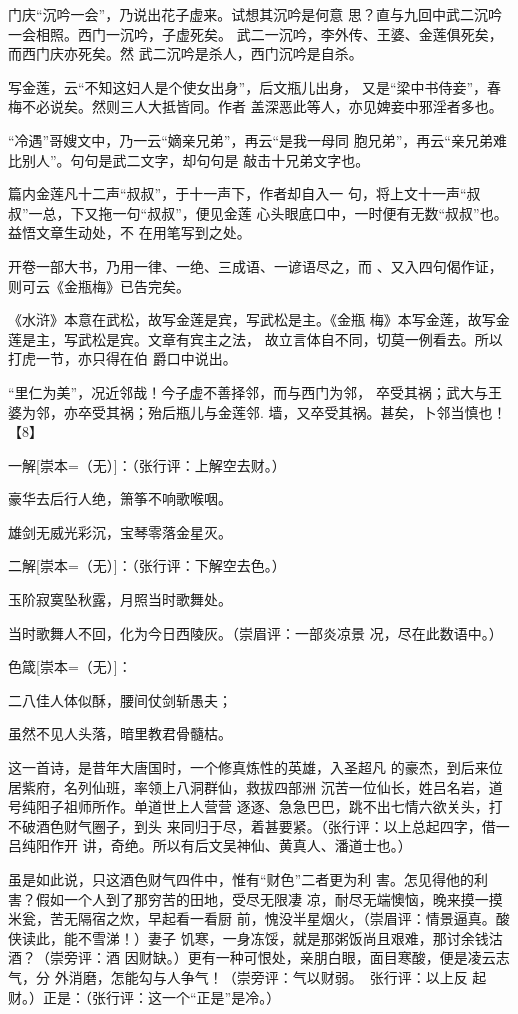 \documentclass[UTF8,scheme=chinese,11pt,linespread=1.4]{ctexbook}
\makeatletter
\newcommand{\banben}[2][]{#2}
\newenvironment{diben}[1]
  {\list{}{\listparindent 2em
    \itemindent\listparindent
    \rightmargin 0em  %
    \leftmargin 0em  %
    \parsep \z@ \@plus\p@}%
   \item\relax}
  {\endlist}
\makeatother
\begin{document}
\begin{diben}
西门庆“沉吟一会”，乃说出花子虚来。试想其沉吟是何意
思？直与九回中武二沉吟一会相照。西门一沉吟，子虚死矣。
武二一沉吟，李外传、王婆、金莲俱死矣，而西门庆亦死矣。然
武二沉吟是杀人，西门沉吟是自杀。

写金莲，云“不知这妇人是个使女出身”，后文瓶儿出身，
又是“梁中书侍妾”，春梅不必说矣。然则三人大抵皆同。作者
盖深恶此等人，亦见婢妾中邪淫者多也。

“冷遇”哥嫂文中，乃一云“嫡亲兄弟”，再云“是我一母同
胞兄弟”，再云“亲兄弟难比别人”。句句是武二文字，却句句是
敲击十兄弟文字也。

篇内金莲凡十二声“叔叔”，于十一声下，作者却自入一
句，将上文十一声“叔叔”一总，下又拖一句“叔叔”，便见金莲
心头眼底口中，一时便有无数“叔叔”也。益悟文章生动处，不
在用笔写到之处。

开卷一部大书，乃用一律、一绝、三成语、一谚语尽之，而
、又入四句偈作证，则可云《金瓶梅》已告完矣。

《水浒》本意在武松，故写金莲是宾，写武松是主。《金瓶
梅》本写金莲，故写金莲是主，写武松是宾。文章有宾主之法，
故立言体自不同，切莫一例看去。所以打虎一节，亦只得在伯
爵口中说出。

“里仁为美”，况近邻哉！今子虚不善择邻，而与西门为邻，
卒受其祸；武大与王婆为邻，亦卒受其祸；殆后瓶儿与金莲邻.
墙，又卒受其祸。甚矣，卜邻当慎也！【8】

\banben{一解}[崇本={（无）}]：（张行评：上解空去财。）

豪华去后行人绝，箫筝不响歌喉咽。

雄剑无威光彩沉，宝琴零落金星灭。

\banben{二解}[崇本={（无）}]：（张行评：下解空去色。）

玉阶寂寞坠秋露，月照当时歌舞处。

当时歌舞人不回，化为今日西陵灰。（崇眉评：一部炎凉景
况，尽在此数语中。）

\banben{色箴}[崇本={（无）}]：

二八佳人体似酥，腰间仗剑斩愚夫；

虽然不见人头落，暗里教君骨髓枯。

这一首诗，是昔年大唐国时，一个修真炼性的英雄，入圣超凡
的豪杰，到后来位居紫府，名列仙班，率领上八洞群仙，救拔四部洲
沉苦一位仙长，姓吕名岩，道号纯阳子祖师所作。单道世上人营营
逐逐、急急巴巴，跳不出七情六欲关头，打不破酒色财气圈子，到头
来同归于尽，着甚要紧。（张行评：以上总起四字，借一吕纯阳作开
讲，奇绝。所以有后文吴神仙、黄真人、潘道士也。）

虽是如此说，只这酒色财气四件中，惟有“财色”二者更为利
害。怎见得他的利害？假如一个人到了那穷苦的田地，受尽无限凄
凉，耐尽无端懊恼，晚来摸一摸米瓮，苦无隔宿之炊，早起看一看厨
前，愧没半星烟火，（崇眉评：情景逼真。酸侠读此，能不雪涕！）妻子
饥寒，一身冻馁，就是那粥饭尚且艰难，那讨余钱沽酒？（崇旁评：酒
因财缺。）更有一种可恨处，亲朋白眼，面目寒酸，便是凌云志气，分
外消磨，怎能勾与人争气！（崇旁评：气以财弱。　张行评：以上反
起财。）正是：（张行评：这一个“正是”是冷。）


\end{diben}
\end{document}
